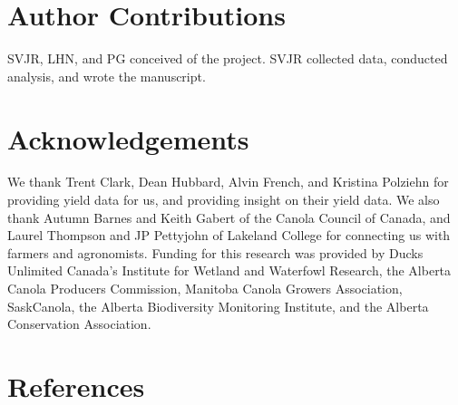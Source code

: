 \documentclass[]{elsarticle} %
\begin{document}
\hypertarget{author-contributions}{%
\section{Author Contributions}\label{author-contributions}}

SVJR, LHN, and PG conceived of the project.
SVJR collected data, conducted analysis, and wrote the manuscript.

\hypertarget{acknowledgements}{%
\section{Acknowledgements}\label{acknowledgements}}

We thank Trent Clark, Dean Hubbard, Alvin French, and Kristina Polziehn for providing yield data for us, and providing insight on their yield data.
We also thank Autumn Barnes and Keith Gabert of the Canola Council of Canada, and Laurel Thompson and JP Pettyjohn of Lakeland College for connecting us with farmers and agronomists.
Funding for this research was provided by Ducks Unlimited Canada's Institute for Wetland and Waterfowl Research, the Alberta Canola Producers Commission, Manitoba Canola Growers Association, SaskCanola, the Alberta Biodiversity Monitoring Institute, and the Alberta Conservation Association.

\hypertarget{references}{%
\section*{References}\label{references}}
\end{document}
